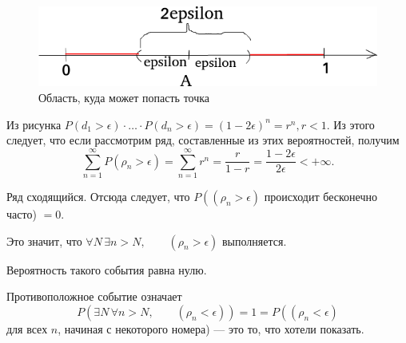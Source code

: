 \begin{figure}[h!]
  \centering
  \includegraphics[width=.4\textwidth]{./pictures/13_21.png}
  \caption{Область, куда может попасть точка}
  \label{fig:1321}
\end{figure}

Из рисунка $P \left( d_1 > \epsilon \right) \cdot \dotsc \cdot P \left( d_n > \epsilon \right) = \left( 1 - 2 \epsilon \right)^n = r^n, r < 1$.
Из этого следует, что если рассмотрим ряд, составленные из этих вероятностей, получим
$$ \sum \limits_{n=1}^{ \infty } P \left( \rho_n > \epsilon \right) = \sum \limits_{n=1}^{ \infty } r^n = \frac{r}{1-r} = \frac{1-2 \epsilon }{2 \epsilon } < + \infty.$$

Ряд сходящийся.
Отсюда следует, что $P \left( \left( \rho_n > \epsilon \right) \right.$ происходит бесконечно часто) $= 0$.

Это значит, что $ \forall N \, \exists n > N, \qquad \left( \rho_n > \epsilon \right) $ выполняется.

Вероятность такого события равна нулю.

Противоположное событие означает
$$P \left( \exists N \, \forall n > N, \qquad \left( \rho_n < \epsilon \right) \right) =
1 =
P \left( \left( \rho_n < \epsilon \right) \right.$$
для всех $n$, начиная с некоторого номера) --- это то, что хотели показать.

